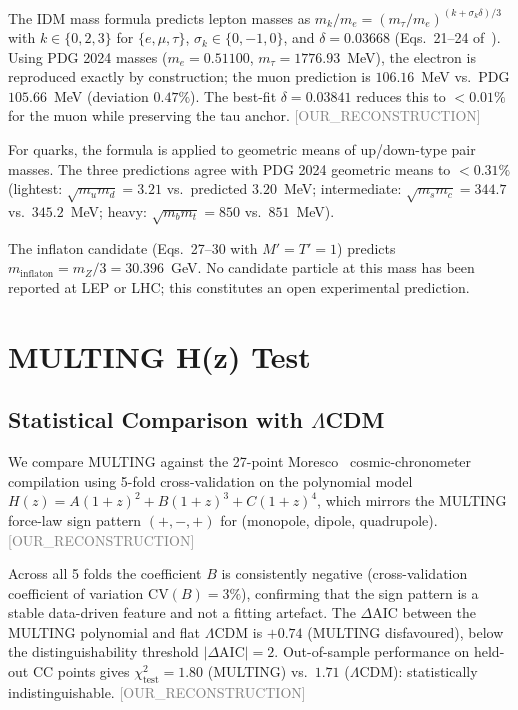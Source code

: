 \documentclass[twocolumn,prd,amsmath,amssymb,floatfix]{revtex4-2}
\newcommand{\reconstruction}{\textcolor{gray}{\small[OUR\_RECONSTRUCTION]}}
\begin{document}
The IDM mass formula predicts lepton masses as
$m_k/m_e = (m_\tau/m_e)^{(k + \sigma_k \delta)/3}$
with $k \in \{0,2,3\}$ for $\{e, \mu, \tau\}$, $\sigma_k \in \{0,-1,0\}$,
and $\delta = 0.03668$ (Eqs.~21--24 of~\cite{buckholtz2026}).
Using PDG 2024 masses ($m_e = 0.51100$, $m_\tau = 1776.93$~MeV), the electron
is reproduced exactly by construction; the muon prediction is $106.16$~MeV
vs.\ PDG $105.66$~MeV (deviation $0.47\%$).
The best-fit $\delta = 0.03841$ reduces this to $< 0.01\%$ for the muon
while preserving the tau anchor.
\reconstruction

For quarks, the formula is applied to geometric means of up/down-type pair masses.
The three predictions agree with PDG 2024 geometric means to $< 0.31\%$
(lightest: $\sqrt{m_u m_d} = 3.21$ vs.\ predicted $3.20$~MeV;
intermediate: $\sqrt{m_s m_c} = 344.7$ vs.\ $345.2$~MeV;
heavy: $\sqrt{m_b m_t} = 850$ vs.\ $851$~MeV).

The inflaton candidate (Eqs.~27--30 with $M'=T'=1$) predicts
$m_\mathrm{inflaton} = m_Z/3 = 30.396$~GeV.
No candidate particle at this mass has been reported at LEP or LHC;
this constitutes an open experimental prediction.

\section{MULTING H(z) Test}
\label{sec:hz}

\subsection{Statistical Comparison with $\Lambda$CDM}

We compare MULTING against the 27-point Moresco~\cite{moresco2022} cosmic-chronometer
compilation using 5-fold cross-validation on the polynomial model
$H(z) = A(1+z)^2 + B(1+z)^3 + C(1+z)^4$, which mirrors the MULTING
force-law sign pattern $(+,-,+)$ for (monopole, dipole, quadrupole).
\reconstruction

Across all 5 folds the coefficient $B$ is consistently negative
(cross-validation coefficient of variation $\mathrm{CV}(B) = 3\%$),
confirming that the sign pattern is a stable data-driven feature and not a
fitting artefact.
The $\Delta\mathrm{AIC}$ between the MULTING polynomial and flat $\Lambda$CDM
is $+0.74$ (MULTING disfavoured), below the distinguishability threshold
$|\Delta\mathrm{AIC}| = 2$.
Out-of-sample performance on held-out CC points gives
$\chi^2_\mathrm{test} = 1.80$ (MULTING) vs.\ $1.71$ ($\Lambda$CDM):
statistically indistinguishable.
\reconstruction
\end{document}
